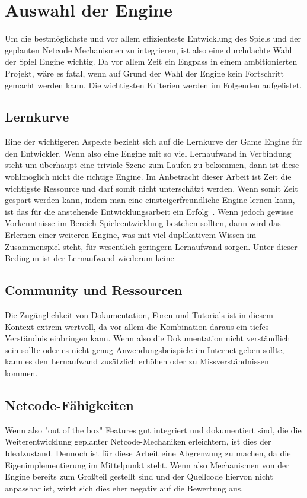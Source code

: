 \chapter{Auswahl der Engine}
Um die bestmöglichste und vor allem effizienteste Entwicklung des Spiels und der geplanten Netcode Mechanismen zu integrieren, ist also eine durchdachte Wahl der Spiel Engine wichtig.
Da vor allem Zeit ein Engpass in einem ambitionierten Projekt, wäre es fatal, wenn auf Grund der Wahl der Engine kein Fortschritt gemacht werden kann. 
Die wichtigsten Kriterien werden im Folgenden aufgelistet.

\section{Lernkurve}
Eine der wichtigeren Aspekte bezieht sich auf die Lernkurve der Game Engine für den Entwickler. Wenn also eine Engine mit so viel Lernaufwand in Verbindung steht um überhaupt eine triviale Szene zum Laufen zu bekommen, dann ist diese wohlmöglich nicht die richtige Engine.
Im Anbetracht dieser Arbeit ist Zeit die wichtigste Ressource und darf somit nicht unterschätzt werden. Wenn somit Zeit gespart werden kann, indem man eine einsteigerfreundliche Engine lernen kann, ist das für die anstehende Entwicklungsarbeit ein Erfolg~. 
Wenn jedoch gewisse Vorkenntnisse im Bereich Spieleentwicklung bestehen sollten, dann wird das Erlernen einer weiteren Engine, was mit viel duplikativem Wissen im Zusammenspiel steht, für wesentlich geringern Lernaufwand sorgen. Unter dieser Bedingun ist der Lernaufwand wiederum keine   

\section{Community und Ressourcen} 
Die Zugänglichkeit von Dokumentation, Foren und Tutorials ist in diesem Kontext extrem wertvoll, da vor allem die Kombination daraus ein tiefes Verständnis einbringen kann. Wenn also die Dokumentation nicht verständlich sein sollte oder es nicht genug Anwendungsbeispiele im Internet geben sollte, kann es den Lernaufwand zusätzlich erhöhen oder zu Missverständnissen kommen.

\section{Netcode-Fähigkeiten}
Wenn also "out of the box" Features gut integriert und dokumentiert sind, die die Weiterentwicklung geplanter Netcode-Mechaniken erleichtern, ist dies der Idealzustand. 
Dennoch ist für diese Arbeit eine Abgrenzung zu machen, da die Eigenimplementierung im Mittelpunkt steht. Wenn also Mechanismen von der Engine bereits zum Großteil gestellt sind und der Quellcode hiervon nicht anpassbar ist, wirkt sich dies eher negativ auf die Bewertung aus.

